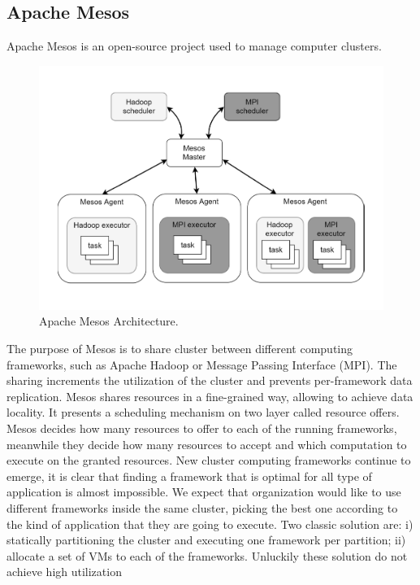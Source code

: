 \subsection{Apache Mesos}\label{sec:apache_mesos}
Apache Mesos is an open-source project used to manage computer
clusters. 
\begin{figure}
	\centering
	\includegraphics[width=\columnwidth]{Images/apache_mesos_architecture.pdf}  
	\caption[Apache Mesos Architecture]{Apache Mesos Architecture.}
	\label{fig:apacheMesosArchitecture}
\end{figure}
The purpose of Mesos is to share cluster between different
computing frameworks, such as Apache Hadoop or Message Passing
Interface (MPI). The sharing increments the utilization of the cluster
and prevents per-framework data replication. 
Mesos shares resources
in a fine-grained way, allowing to achieve data locality. It presents
a scheduling mechanism on two layer called resource offers. Mesos
decides how many resources to offer to each of the running frameworks,
meanwhile they decide how many resources to accept and
which computation to execute on the granted resources.
New cluster computing frameworks continue to emerge, it is clear
that finding a framework that is optimal for all type of application
is almost impossible. We expect that organization would like to use
different frameworks inside the same cluster, picking the best one according
to the kind of application that they are going to execute. Two
classic solution are: i) statically partitioning the cluster and executing
one framework per partition; ii) allocate a set of VMs to each of the
frameworks. Unluckily these solution do not achieve high utilization
